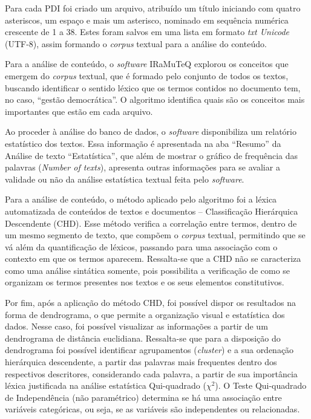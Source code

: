 \documentclass[portuguese]{textolivre}
\begin{document}
Para cada PDI foi criado um arquivo, atribuído um título iniciando com quatro asteriscos, um espaço e mais um asterisco, nominado em sequência numérica crescente de 1 a 38. Estes foram salvos em uma lista em formato \textit{txt Unicode} (UTF-8), assim formando o \textit{corpus} textual para a análise do conteúdo.

Para a análise de conteúdo, o \textit{software} IRaMuTeQ explorou os conceitos que emergem do \textit{corpus} textual, que é formado pelo conjunto de todos os textos, buscando identificar o sentido léxico que os termos contidos no documento tem, no caso, “gestão democrática”. O algoritmo identifica quais são os conceitos mais importantes que estão em cada arquivo.

Ao proceder à análise do banco de dados, o \textit{software} disponibiliza um relatório estatístico dos textos. Essa informação é apresentada na aba “Resumo” da Análise de texto “Estatística”, que além de mostrar o gráfico de frequência das palavras (\textit{Number of texts}), apresenta outras informações para se avaliar a validade ou não da análise estatística textual feita pelo \textit{software}.

Para a análise de conteúdo, o método aplicado pelo algoritmo foi a léxica automatizada de conteúdos de textos e documentos – Classificação Hierárquica Descendente (CHD). Esse método verifica a correlação entre termos, dentro de um mesmo segmento de texto, que compõem o \textit{corpus} textual, permitindo que se vá além da quantificação de léxicos, passando para uma associação com o contexto em que os termos aparecem. Ressalta-se que a CHD não se caracteriza como uma análise sintática somente, pois possibilita a verificação de como se organizam os termos presentes nos textos e os seus elementos constitutivos.

Por fim, após a aplicação do método CHD, foi possível dispor os resultados na forma de dendrograma, o que permite a organização visual e estatística dos dados. Nesse caso, foi possível visualizar as informações a partir de um dendrograma de distância euclidiana. Ressalta-se que para a disposição do dendrograma foi possível identificar agrupamentos (\textit{cluster}) e a sua ordenação hierárquica descendente, a partir das palavras mais frequentes dentro dos respectivos descritores, considerando cada palavra, a partir de sua importância léxica justificada na análise estatística Qui-quadrado ($\chi^2$). O Teste Qui-quadrado de Independência (não paramétrico) determina se há uma associação entre variáveis categóricas, ou seja, se as variáveis são independentes ou relacionadas.
\end{document}
